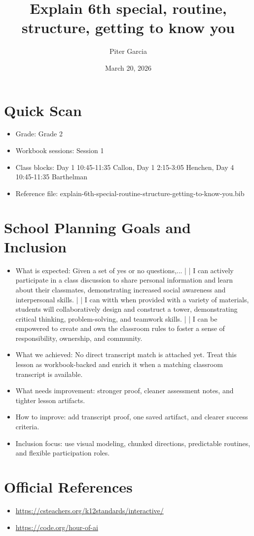 \documentclass[11pt]{article}
\title{Explain 6th special, routine, structure, getting to know you}
\author{Piter Garcia}
\date{March 20, 2026}
\begin{document}
    \maketitle
    \section*{Quick Scan}
    \begin{itemize}[leftmargin=*]
    \item Grade: Grade 2
    \item Workbook sessions: Session 1
    \item Class blocks: Day 1 10:45-11:35 Callon, Day 1 2:15-3:05 Henchen, Day 4 10:45-11:35 Barthelman
    \item Reference file: explain-6th-special-routine-structure-getting-to-know-you.bib
    \end{itemize}
    \section*{School Planning Goals and Inclusion}
    \begin{itemize}[leftmargin=*]
    \item What is expected: Given a set of yes or no questions,... | | I can actively participate in a class discussion to share personal information and learn about their classmates, demonstrating increased social awareness and interpersonal skills. | | I can witth when provided with a variety of materials, students will collaboratively design and construct a tower, demonstrating critical thinking, problem-solving, and teamwork skills. | | I can be empowered to create and own the classroom rules to foster a sense of responsibility, ownership, and community.
    \item What we achieved: No direct transcript match is attached yet. Treat this lesson as workbook-backed and enrich it when a matching classroom transcript is available.
    \item What needs improvement: stronger proof, cleaner assessment notes, and tighter lesson artifacts.
    \item How to improve: add transcript proof, one saved artifact, and clearer success criteria.
    \item Inclusion focus: use visual modeling, chunked directions, predictable routines, and flexible participation roles.
    \end{itemize}
    \section*{Official References}
    \begin{itemize}[leftmargin=*]
    \item \url{https://csteachers.org/k12standards/interactive/}
\item \url{https://code.org/hour-of-ai}

    \end{itemize}
    
\end{document}
